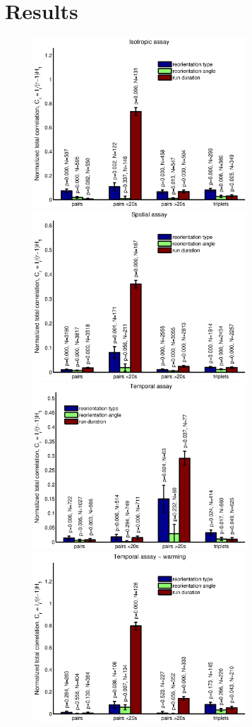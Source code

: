 \documentclass[12pt]{article}
\begin{document}
\section{Results}\label{sec:results}

\begin{figure}
  \begin{center}
    \includegraphics[width=8cm]{isotropic.eps}
    \includegraphics[width=8cm]{spatial.eps}\\
    \includegraphics[width=8cm]{temporal.eps}
    \includegraphics[width=8cm]{warming.eps}\\

\end{center}
\end{figure}
\end{document}
